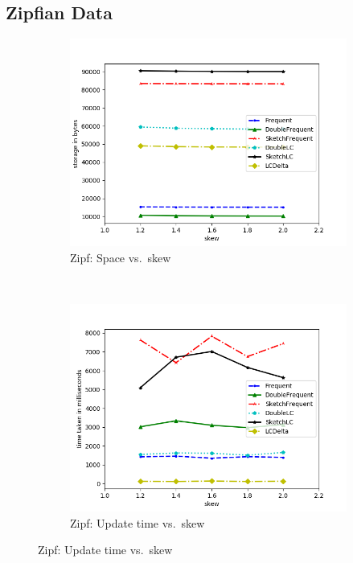 \documentclass[sigconf,review=true,anonymous=true,screen]{acmart}
\begin{document}
\subsection{Zipfian Data}
\begin{figure}[b]
\centering
\begin{subfigure}[b]{0.3\textwidth}
\includegraphics[width=\textwidth]{../Plots/storage_skew.png}
\caption{Zipf: Space vs.~skew}
\end{subfigure}
~
\begin{subfigure}[b]{0.3\textwidth}
\includegraphics[width=\textwidth]{../Plots/time_skew.png}
\caption{Zipf: Update time vs.~skew}
\end{subfigure}


\end{figure}
\end{document}

